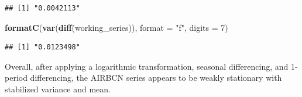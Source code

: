 \documentclass[
]{article}
\newenvironment{Shaded}{\begin{snugshade}}{\end{snugshade}}
\newcommand{\AttributeTok}[1]{\textcolor[rgb]{0.13,0.29,0.53}{#1}}
\newcommand{\DecValTok}[1]{\textcolor[rgb]{0.00,0.00,0.81}{#1}}
\newcommand{\FunctionTok}[1]{\textcolor[rgb]{0.13,0.29,0.53}{\textbf{#1}}}
\newcommand{\NormalTok}[1]{#1}
\newcommand{\StringTok}[1]{\textcolor[rgb]{0.31,0.60,0.02}{#1}}
\begin{document}
\begin{verbatim}
## [1] "0.0042113"
\end{verbatim}

\begin{Shaded}
\begin{Highlighting}[]
\FunctionTok{formatC}\NormalTok{(}\FunctionTok{var}\NormalTok{(}\FunctionTok{diff}\NormalTok{(working\_series)), }\AttributeTok{format =} \StringTok{"f"}\NormalTok{, }\AttributeTok{digits =} \DecValTok{7}\NormalTok{)}
\end{Highlighting}
\end{Shaded}

\begin{verbatim}
## [1] "0.0123498"
\end{verbatim}

Overall, after applying a logarithmic transformation, seasonal
differencing, and 1-period differencing, the AIRBCN series appears to be
weakly stationary with stabilized variance and mean.
\end{document}
